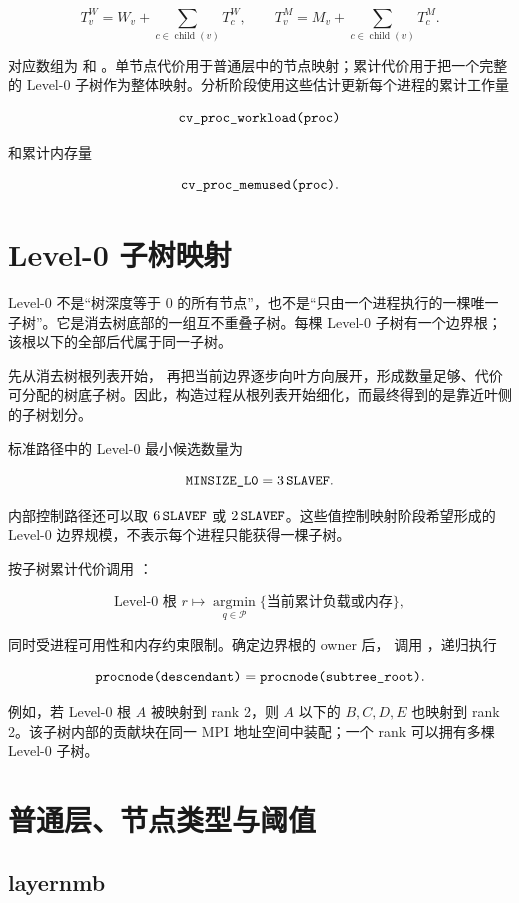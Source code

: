 \[
T^W_v=W_v+\sum_{c\in\operatorname{child}(v)}T^W_c,
\qquad
T^M_v=M_v+\sum_{c\in\operatorname{child}(v)}T^M_c.
\]

对应数组为  和 。单节点代价用于普通层中的节点映射；累计代价用于把一个完整的 Level-0 子树作为整体映射。分析阶段使用这些估计更新每个进程的累计工作量

\[
\texttt{cv\_proc\_workload(proc)}
\]

和累计内存量

\[
\texttt{cv\_proc\_memused(proc)}.
\]

\section{Level-0 子树映射}

Level-0 不是“树深度等于 0 的所有节点”，也不是“只由一个进程执行的一棵唯一子树”。它是消去树底部的一组互不重叠子树。每棵 Level-0 子树有一个边界根；该根以下的全部后代属于同一子树。

 先从消去树根列表开始， 再把当前边界逐步向叶方向展开，形成数量足够、代价可分配的树底子树。因此，构造过程从根列表开始细化，而最终得到的是靠近叶侧的子树划分。

标准路径中的 Level-0 最小候选数量为

\[
\texttt{MINSIZE\_L0}=3\,\texttt{SLAVEF}.
\]

内部控制路径还可以取 $6\,\texttt{SLAVEF}$ 或 $2\,\texttt{SLAVEF}$。这些值控制映射阶段希望形成的 Level-0 边界规模，不表示每个进程只能获得一棵子树。

 按子树累计代价调用 ：

\[
\text{Level-0 根 }r
\longmapsto
\operatorname*{argmin}_{q\in\mathcal P}
\{\text{当前累计负载或内存}\},
\]

同时受进程可用性和内存约束限制。确定边界根的 owner 后， 调用 ，递归执行

\[
\texttt{procnode(descendant)}=
\texttt{procnode(subtree\_root)}.
\]

例如，若 Level-0 根 $A$ 被映射到 rank 2，则 $A$ 以下的 $B,C,D,E$ 也映射到 rank 2。该子树内部的贡献块在同一 MPI 地址空间中装配；一个 rank 可以拥有多棵 Level-0 子树。

\section{普通层、节点类型与阈值}

\subsection{layernmb}

